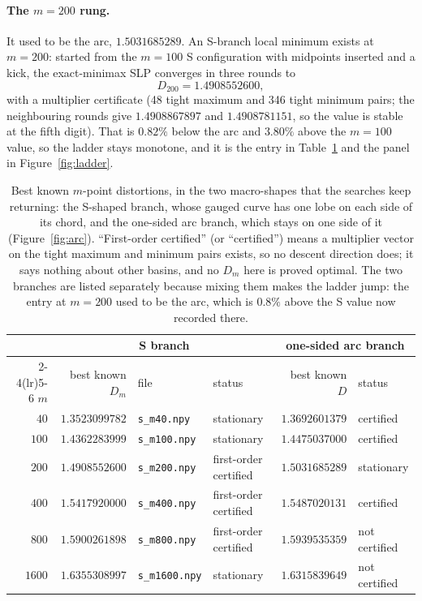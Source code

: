 \documentclass[11pt]{article}
\theoremstyle{remark}
\begin{document}
\paragraph{The $m=200$ rung.} It used to be the arc, $1.5031685289$. An S-branch local minimum
exists at $m=200$: started from the $m=100$ S configuration with midpoints inserted and a kick, the
exact-minimax SLP converges in three rounds to
\[
  D_{200}=1.4908552600,
\]
with a multiplier certificate (48 tight maximum and 346 tight minimum pairs; the neighbouring
rounds give $1.4908867897$ and $1.4908781151$, so the value is stable at the fifth digit). That is
$0.82\%$ below the arc and $3.80\%$ above the $m=100$ value, so the ladder stays monotone, and it
is the entry in Table~\ref{tab:ladder} and the panel in Figure~\ref{fig:ladder}.

\begin{table}[t]
\centering
\small
\begin{tabular}{rrllrl}
\toprule
 & \multicolumn{3}{c}{S branch} & \multicolumn{2}{c}{one-sided arc branch}\\
\cmidrule(lr){2-4}\cmidrule(lr){5-6}
$m$ & best known $D_m$ & file & status & best known $D$ & status\\
\midrule
$40$   & $1.3523099782$ & \texttt{s\_m40.npy}          & stationary            & $1.3692601379$ & certified\\
$100$  & $1.4362283999$ & \texttt{s\_m100.npy}         & stationary            & $1.4475037000$ & certified\\
$200$  & $1.4908552600$ & \texttt{s\_m200.npy}         & first-order certified & $1.5031685289$ & stationary\\
$400$  & $1.5417920000$ & \texttt{s\_m400.npy}         & first-order certified & $1.5487020131$ & certified\\
$800$  & $1.5900261898$ & \texttt{s\_m800.npy}         & first-order certified & $1.5939535359$ & not certified\\
$1600$ & $1.6355308997$ & \texttt{s\_m1600.npy}        & stationary            & $1.6315839649$ & not certified\\
\bottomrule
\end{tabular}
\caption{Best known $m$-point distortions, in the two macro-shapes that the searches keep returning:
the S-shaped branch, whose gauged curve has one lobe on each side of its chord, and the one-sided
arc branch, which stays on one side of it (Figure~\ref{fig:arc}). ``First-order certified'' (or
``certified'') means a multiplier vector on the tight maximum and minimum pairs exists, so no
descent direction does; it says nothing about other basins, and no $D_m$ here is proved optimal.
The two branches are listed separately because mixing them makes the ladder jump: the entry at
$m=200$ used to be the arc, which is $0.8\%$ above the S value now recorded there.}
\label{tab:ladder}
\end{table}
\end{document}
